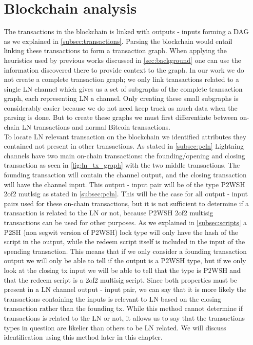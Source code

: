 \section{Blockchain analysis}
\label{sec:bc_analysis}

The transactions in the blockchain is linked with outputs - inputs forming a DAG as we explained in \cref{subsec:transactions}. Parsing the blockchain would entail linking these transactions to form a transaction graph. When applying the heuristics used by previous works discussed in \cref{sec:background} one can use the information discovered there to provide context to the graph. In our work we do not create a complete transaction graph; we only link transactions related to a single LN channel which gives us a set of subgraphs of the complete transaction graph, each representing LN a channel. Only creating these small subgraphs is considerably easier because we do not need keep track as much data when the parsing is done. But to create these graphs we must first differentiate between on-chain LN transactions and normal Bitcoin transactions.
\\

To locate LN relevant transaction on the blockchain we identified attributes they contained not present in other transactions. As stated in \cref{subsec:pcln} Lightning channels have two main on-chain transactions: the founding/opening and closing transaction as seen in \cref{fig:ln_tx_graph} with the two middle transactions. The founding transaction will contain the channel output, and the closing transaction will have the channel input. This output - input pair will be of the type P2WSH 2of2 mutlsig as stated in \cref{subsec:pcln}. This will be the case for all output - input pairs used for these on-chain transactions, but it is not sufficient to determine if a transaction is related to the LN or not, because P2WSH 2of2 multisig transactions can be used for other purposes. As we explained in \cref{subsec:scripts} a P2SH (non segwit version of P2WSH) lock type will only have the hash of the script in the output, while the redeem script itself is included in the input of the spending transaction. This means that if we only consider a founding transaction output we will only be able to tell if the output is a P2WSH type, but if we only look at the closing tx input we will be able to tell that the type is P2WSH and that the redeem script is a 2of2 multisig script. Since both properties must be present in a LN channel output - input pair, we can say that it is more likely the transactions containing the inputs is relevant to LN based on the closing transaction rather than the founding tx. While this method cannot determine if transactions is related to the LN or not, it allows us to say that the transactions types in question are likelier than others to be LN related. We will discuss identification using this method later in this chapter.
\\

